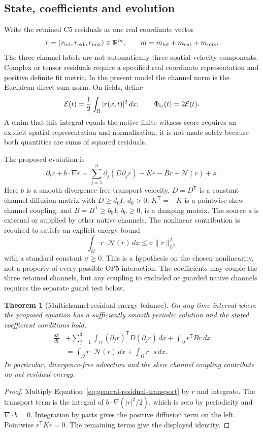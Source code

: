 \documentclass[11pt,a4paper]{article}
\newtheorem{theorem}{Theorem}
\begin{document}
\subsection{State, coefficients and evolution}
Write the retained C5 residuals as one real coordinate vector
\[
r=(r_{\rm bd},r_{\rm ext},r_{\rm mix})\in\mathbb R^m,
\qquad m=m_{\rm bd}+m_{\rm ext}+m_{\rm mix}.
\]
The three channel labels are not automatically three spatial velocity
components. Complex or tensor residuals require a specified real coordinate
representation and positive definite fit metric. In the present model the
channel norm is the Euclidean direct-sum norm. On fields, define
\[
\mathcal E(t)=\frac12\int_\Omega |r(x,t)|^2\,dx,
\qquad \Phi_{\rm tr}(t)=2\mathcal E(t).
\]
A claim that this integral equals the native finite witness score requires
an explicit spatial representation and normalization; it is not made solely
because both quantities are sums of squared residuals.

The proposed evolution is
\begin{equation}
\label{eq:general-residual-transport}
\partial_t r+b\cdot\nabla r
=\sum_{j=1}^3\partial_j(D\partial_jr)-Kr-Br
+\mathcal N(r)+s.
\end{equation}
Here $b$ is a smooth divergence-free transport velocity, $D=D^{\mathsf T}$
is a constant channel-diffusion matrix with $D\ge d_0I$, $d_0>0$,
$K^{\mathsf T}=-K$ is a pointwise skew channel coupling, and
$B=B^{\mathsf T}\ge b_0I$, $b_0\ge0$, is a damping matrix.
The source $s$ is external or supplied by other native channels.
The nonlinear contribution is required to satisfy an explicit energy bound
\[
\int_\Omega r\cdot\mathcal N(r)\,dx
\le\sigma\|r\|_{L^2}^2
\]
with a standard constant $\sigma\ge0$. This is a hypothesis on the chosen
nonlinearity, not a property of every possible OP5 interaction.
The coefficients may couple the three retained channels, but any coupling
to excluded or guarded native channels requires the separate guard test below.

\begin{theorem}[Multichannel residual energy balance]
\label{thm:transport-energy}
On any time interval where the proposed equation has a sufficiently smooth
periodic solution and the stated coefficient conditions hold,
\begin{align*}
\frac{d\mathcal E}{dt}
&+\sum_{j=1}^3\int_\Omega(\partial_jr)^{\mathsf T}D(\partial_jr)\,dx
+\int_\Omega r^{\mathsf T}Br\,dx\\
&=\int_\Omega r\cdot\mathcal N(r)\,dx
+\int_\Omega r\cdot s\,dx.
\end{align*}
In particular, divergence-free advection and the skew channel coupling
contribute no net residual energy.
\end{theorem}
\begin{proof}
Multiply Equation~\eqref{eq:general-residual-transport} by $r$ and integrate.
The transport term is the integral of $b\cdot\nabla(|r|^2/2)$, which is zero
by periodicity and $\nabla\cdot b=0$. Integration by parts gives the positive
diffusion term on the left. Pointwise $r^{\mathsf T}Kr=0$. The remaining
terms give the displayed identity.
\end{proof}
\end{document}
